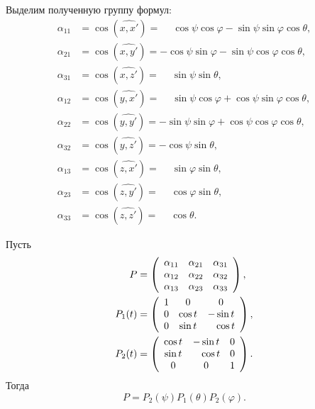Выделим полученную группу формул:
\begin{equation}
  \label{eq:euler_cos}
  \begin{aligned}
    \alpha_{11} &= \cos(\widehat{x, x'})
      = \phantom{-} \cos\psi \cos\varphi - \sin\psi \sin\varphi \cos\theta, \\
    \alpha_{21} &= \cos(\widehat{x, y'})
      = -\cos\psi \sin\varphi - \sin\psi \cos\varphi \cos\theta, \\
    \alpha_{31} &= \cos(\widehat{x, z'})
      = \phantom{-} \sin\psi \sin\theta, \\
    \alpha_{12} &= \cos(\widehat{y, x'})
      = \phantom{-} \sin\psi \cos\varphi + \cos\psi \sin\varphi \cos\theta, \\
    \alpha_{22} &= \cos(\widehat{y, y'})
      = -\sin\psi \sin\varphi + \cos\psi \cos\varphi \cos\theta, \\
    \alpha_{32} &= \cos(\widehat{y, z'})
      = -\cos\psi \sin\theta, \\
    \alpha_{13} &= \cos(\widehat{z, x'})
      = \phantom{-} \sin\varphi \sin\theta, \\
    \alpha_{23} &= \cos(\widehat{z, y'})
      = \phantom{-} \cos\varphi \sin\theta, \\
    \alpha_{33} &= \cos(\widehat{z, z'})
      = \phantom{-} \cos\theta.
  \end{aligned}
\end{equation}

\begin{theorem}
  Пусть
  \begin{equation*}
    \begin{aligned}
      P &= \left(
        \begin{array}{c c c}
          \alpha_{11} & \alpha_{21} & \alpha_{31} \\
          \alpha_{12} & \alpha_{22} & \alpha_{32} \\
          \alpha_{13} & \alpha_{23} & \alpha_{33}
        \end{array}
        \right), \\
      P_1(t) &= \left(
      \begin{array}{c c c}
        1 & 0 & 0 \\
        0 & \cos t & -\sin t \\
        0 & \sin t & \phantom{-} \cos t
      \end{array}
      \right), \\
      P_2(t) &= \left(
      \begin{array}{c c c}
        \cos t & -\sin t & 0 \\
        \sin t & \phantom{-} \cos t & 0 \\
        0 & 0 & 1
      \end{array}
      \right).
    \end{aligned}
  \end{equation*}
  Тогда
  \begin{equation}
    P = P_2(\psi) P_1(\theta) P_2(\varphi).
  \end{equation}
\end{theorem}

